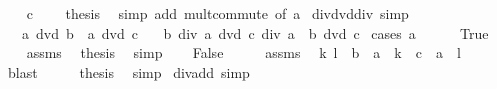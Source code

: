 \begin{isabellebody}
\isanewline
\ \ \isamarkupfalse%
\ {\isacartoucheopen}c\ {\isasymnoteq}\ {}{\isacartoucheclose}\ \isamarkupfalse%
\ {\isacharquery}{\kern0pt}thesis\ \isamarkupfalse%
\ {\isacharparenleft}{\kern0pt}simp\ add{\isacharcolon}{\kern0pt}\ mult{\isachardot}{\kern0pt}commute\ {\isacharbrackleft}{\kern0pt}of\ a{\isacharbrackright}{\kern0pt}{\isacharparenright}{\kern0pt}\isanewline
{}\isamarkupfalse%
%
\endisatagproof
{\isafoldproof}%
%
\isadelimproof
\isanewline
%
\endisadelimproof
\isanewline
{}\isamarkupfalse%
\ div{\isacharunderscore}{\kern0pt}dvd{\isacharunderscore}{\kern0pt}div\ {\isacharbrackleft}{\kern0pt}simp{\isacharbrackright}{\kern0pt}{\isacharcolon}{\kern0pt}\isanewline
\ \ \ {\isachardoublequoteopen}a\ dvd\ b{\isachardoublequoteclose}\ \ {\isachardoublequoteopen}a\ dvd\ c{\isachardoublequoteclose}\isanewline
\ \ \ {\isachardoublequoteopen}b\ div\ a\ dvd\ c\ div\ a\ {\isasymlongleftrightarrow}\ b\ dvd\ c{\isachardoublequoteclose}\isanewline
%
\isadelimproof
%
\endisadelimproof
%
\isatagproof
{}\isamarkupfalse%
\ {\isacharparenleft}{\kern0pt}cases\ {\isachardoublequoteopen}a\ {\isacharequal}{\kern0pt}\ {}{\isachardoublequoteclose}{\isacharparenright}{\kern0pt}\isanewline
\ \ \isamarkupfalse%
\ True\isanewline
\ \ \isamarkupfalse%
\ assms\ \isamarkupfalse%
\ {\isacharquery}{\kern0pt}thesis\ \isamarkupfalse%
\ simp\isanewline
{}\isamarkupfalse%
\isanewline
\ \ \isamarkupfalse%
\ False\isanewline
\ \ \isamarkupfalse%
\ \isamarkupfalse%
\ assms\ \isamarkupfalse%
\ k\ l\ \ {\isachardoublequoteopen}b\ {\isacharequal}{\kern0pt}\ a\ {\isacharasterisk}{\kern0pt}\ k{\isachardoublequoteclose}\ \ {\isachardoublequoteopen}c\ {\isacharequal}{\kern0pt}\ a\ {\isacharasterisk}{\kern0pt}\ l{\isachardoublequoteclose}\isanewline
\ \ \ \ \isamarkupfalse%
\ blast\isanewline
\ \ \isamarkupfalse%
\ \isamarkupfalse%
\ {\isacharquery}{\kern0pt}thesis\ \isamarkupfalse%
\ simp\isanewline
{}\isamarkupfalse%
%
\endisatagproof
{\isafoldproof}%
%
\isadelimproof
\isanewline
%
\endisadelimproof
\isanewline
{}\isamarkupfalse%
\ div{\isacharunderscore}{\kern0pt}add\ {\isacharbrackleft}{\kern0pt}simp{\isacharbrackright}{\kern0pt}{\isacharcolon}{\kern0pt}\isanewline

\end{isabellebody}
